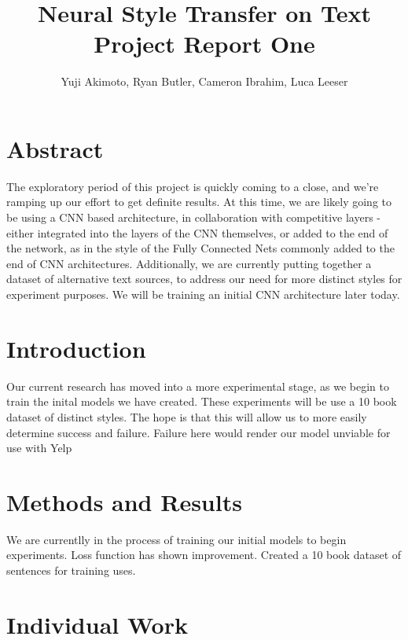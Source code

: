 \documentclass{article}
\title{Neural Style Transfer on Text\\Project Report One}
\author{Yuji Akimoto, Ryan Butler, Cameron Ibrahim, Luca Leeser}
\begin{document}
\maketitle

\section*{Abstract}

The exploratory period of this project is quickly coming to a close, and we're ramping up our 
effort to get definite results. At this time, we are likely going to be using a CNN based
architecture, in collaboration with competitive layers - either integrated into the layers of the CNN themselves,
or added to the end of the network, as in the style of the Fully Connected Nets commonly added to the end of CNN
architectures. Additionally, we are currently putting together a dataset of alternative text sources, to address
our need for more distinct styles for experiment purposes. We will be training an initial CNN architecture later
today.


\section{Introduction}

Our current research has moved into a more experimental stage, as we begin to train the inital models we have created. These experiments will be
use a 10 book dataset of distinct styles. The hope is that this will allow us to more easily determine success and failure. Failure here would 
render our model unviable for use with Yelp


\section{Methods and Results}

We are currentlly in the process of training our initial models to begin experiments. Loss function has shown improvement. Created a 10 book dataset of sentences
for training uses.

\section{Individual Work}
\end{document}
